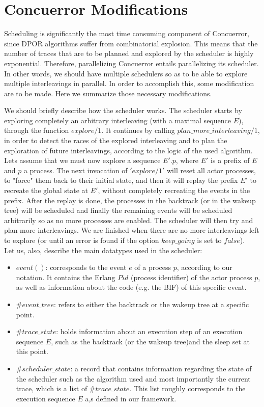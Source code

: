 \chapter{Concuerror Modifications}
\label{conc_mods}

Scheduling is significantly the most time consuming component of Concuerror, since DPOR algorithms suffer from combinatorial explosion. 
This means that the number of traces that are to be planned and explored by the scheduler is highly exponential. Therefore, parallelizing Concuerror 
entails parallelizing its scheduler. In other words, we should have multiple schedulers so as to be able to explore 
multiple interleavings in parallel. In order to accomplish this, some modification are to be made.
Here we summarize those necessary modifications.

We should briefly describe how the scheduler works. The scheduler starts by exploring completely an arbitrary interleaving (with a maximal sequence $E$), 
through the function $explore/1$.
It continues by calling $plan\_more\_interleaving/1$, in order to detect the races of the explored interleaving and to plan the exploration of 
future interleavings, according to the logic of the used algorithm. Lets assume that we must now explore a sequence $E'.p$, where $E'$ is a prefix
of $E$ and $p$ a process. The next invocation of $'explore/1'$ will reset all actor processes, to "force" them back to their initial state, and
then it will replay the prefix $E'$ to recreate the global state at $E'$, without completely recreating the events in the prefix. After the replay is done,
the processes in the backtrack (or in the wakeup tree) will be scheduled and finally the remaining events will be scheduled arbitrarily so as no
more processes are enabled. The scheduler will then try and plan more interleavings. We are finished when there are no more interleavings left to explore
(or until an error is found if the option $keep\_going$ is set to $false$).
\\

\noindent Let us, also, describe the main datatypes used in the scheduler:
\begin{itemize} 
\item $event()$: corresponds to the event $e$ of a process $p$, according to our notation. It contains the
Erlang $Pid$ (process identifier) of the actor process $p$, as well as information about the code (e.g. the BIF) of this specific event.
\item $\#event\_tree$: refers to either the backtrack or the wakeup tree at a specific point.
\item $\#trace\_state$: holds information about an execution step of an execution sequence $E$, 
such as the backtrack (or the wakeup tree)and the sleep set at this point.
\item $\#scheduler\_state$: a record that contains information regarding the state of the scheduler
such as the algorithm used and most importantly the current trace, which is a list of $\#trace\_state$. This list
roughly corresponds to the execution sequence $E$ a,s defined in our framework.
\end{itemize}

